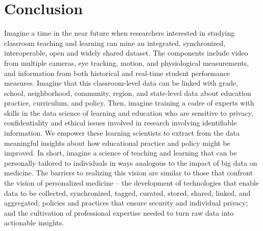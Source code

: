 \documentclass[letterpaper,man,apacite]{apa6}
\begin{document}
\section{Conclusion}
Imagine a time in the near future when researchers interested in studying classroom teaching and learning can mine an integrated, synchronized, interoperable, open and widely shared dataset. 
The components include video from multiple cameras, eye tracking, motion, and physiological measurements, and information from both historical and real-time student performance measures. 
Imagine that this classroom-level data can be linked with grade, school, neighborhood, community, region, and state-level data about education practice, curriculum, and policy. 
Then, imagine training a cadre of experts with skills in the data science of learning and education who are sensitive to privacy, confidentiality and ethical issues involved in research involving identifiable information. 
We empower these learning scientists to extract from the data meaningful insights about how educational practice and policy might be improved. 
In short, imagine a science of teaching and learning that can be personally tailored to individuals in ways analogous to the impact of big data on medicine. 
The barriers to realizing this vision are similar to those that confront the vision of personalized medicine – the development of technologies that enable data to be collected, synchronized, tagged, curated, stored, shared, linked, and aggregated; policies and practices that ensure security and individual privacy; and the cultivation of professional expertise needed to turn raw data into actionable insights.
\end{document}
